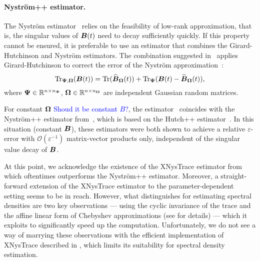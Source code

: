 \paragraph{Nyström++ estimator.}
The Nyström estimator~ relies on the feasibility of low-rank approximation, that is, the singular values of $\boldsymbol{B}(t)$ need to decay sufficiently quickly.
If this property cannot be ensured, it is preferable to use an estimator that combines the Girard-Hutchinson and Nyström estimators.
The combination suggested in~\cite{lin-2017-randomized-estimation} applies Girard-Hutchinson to correct the error of the Nyström approximation~:
\begin{equation}
    \operatorname{Tr}_{\boldsymbol{\Psi}, \boldsymbol{\Omega}}(\boldsymbol{B}(t)) = \operatorname{Tr}(\widehat{\boldsymbol{B}}_{\boldsymbol{\Omega}}(t)) + \operatorname{Tr}_{\boldsymbol{\Psi}}(\boldsymbol{B}(t) - \widehat{\boldsymbol{B}}_{\boldsymbol{\Omega}}(t)),
    \label{equ:nystrompp-trace-estimator}
\end{equation}
where $\boldsymbol{\Psi} \in \mathbb{R}^{n \times n_{\boldsymbol{\Psi}}}$, $\boldsymbol{\Omega} \in \mathbb{R}^{n \times n_{\boldsymbol{\Omega}}}$ are independent Gaussian random matrices. 

For constant $\boldsymbol{\Omega}$ \textcolor{blue}{Shoud it be constant $B$?}, the estimator~ coincides with the Nyström++ estimator from~\cite{persson-2022-improved-variants}, which is based on the Hutch++ estimator~\cite{meyer-2021-hutch-optimal}. In this situation (constant $\boldsymbol{B}$), these estimators were both shown to achieve a relative $\varepsilon$-error with $\mathcal{O}(\varepsilon^{-1})$ matrix-vector products only, independent of the singular value decay of $\boldsymbol{B}$.

At this point, we acknowledge the existence of the XNysTrace estimator from \cite{epperly-2024-xtrace-making} which oftentimes outperforms the Nyström++ estimator. Moreover, a straight-forward extension of the XNysTrace estimator to the parameter-dependent setting seems to be in reach. However, what distinguishes  for estimating spectral densities are two key observations --- using the cyclic invariance of the trace and the affine linear form of Chebyshev approximations (see  for details) --- which it exploits to significantly speed up the computation. Unfortunately, we do not see a way of marrying these observations with the efficient implementation of XNysTrace described in \cite[Section 2.2]{epperly-2024-xtrace-making}, which limits its suitability for spectral density estimation.

